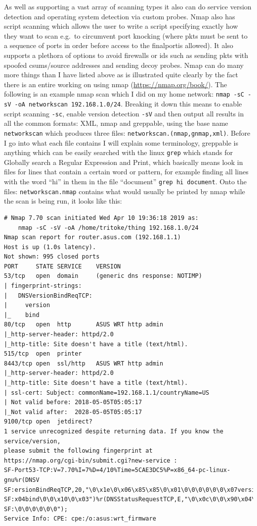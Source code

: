 \documentclass[titlepage]{article}
\begin{document}
As well as supporting a vast array of scanning types it also can do \gls{service} version detection 
and operating system detection via custom probes. Nmap also has script scanning which allows the 
user to write a script specifying exactly how they want to scan e.g.\ to circumvent \gls{port 
knocking} (where \glspl{pkt} must be sent to a sequence of \glspl{port} in order before access to 
the final\gls{port}is allowed). It also supports a plethora of options to avoid firewalls or 
\gls{ids} such as sending \glspl{pkt} with spoofed \glspl{csum}/source addresses and sending decoy 
probes. Nmap can do many more things than I have listed above as is illustrated quite clearly by the
fact there is an entire working on using nmap 
(\href{https://nmap.org/book/}{https://nmap.org/book/}). The following is an example nmap scan
which I did on my home network: \verb|nmap -sC -sV -oA networkscan 192.168.1.0/24|. Breaking
it down this means to enable script scanning \verb|-sc|, enable version detection \verb|-sV|
and then output all results in all the common formats: XML, nmap and greppable, using the
base name \verb|networkscan| which produces three files: \verb|networkscan.(nmap,gnmap,xml)|.
Before I go into what each file contains I will explain some terminology, greppable is anything
which can be easily searched with the linux \verb|grep| which stands for Globally search a Regular
Expression and Print, which basically means look in files for lines that contain a certain word
or pattern, for example finding all lines with the word ``hi'' in them in the file ``document''
\verb|grep hi document|. Onto the files: \verb|networkscan.nmap| contains what would usually
be printed by nmap while the scan is being run, it looks like this:
\begin{verbatim}
# Nmap 7.70 scan initiated Wed Apr 10 19:36:18 2019 as:
    nmap -sC -sV -oA /home/tritoke/thing 192.168.1.0/24
Nmap scan report for router.asus.com (192.168.1.1)
Host is up (1.0s latency).
Not shown: 995 closed ports
PORT     STATE SERVICE    VERSION
53/tcp   open  domain     (generic dns response: NOTIMP)
| fingerprint-strings: 
|   DNSVersionBindReqTCP: 
|     version
|_    bind
80/tcp   open  http       ASUS WRT http admin
|_http-server-header: httpd/2.0
|_http-title: Site doesn't have a title (text/html).
515/tcp  open  printer
8443/tcp open  ssl/http   ASUS WRT http admin
|_http-server-header: httpd/2.0
|_http-title: Site doesn't have a title (text/html).
| ssl-cert: Subject: commonName=192.168.1.1/countryName=US
| Not valid before: 2018-05-05T05:05:17
|_Not valid after:  2028-05-05T05:05:17
9100/tcp open  jetdirect?
1 service unrecognized despite returning data. If you know the service/version,
please submit the following fingerprint at
https://nmap.org/cgi-bin/submit.cgi?new-service :
SF-Port53-TCP:V=7.70%I=7%D=4/10%Time=5CAE3DC5%P=x86_64-pc-linux-gnu%r(DNSV
SF:ersionBindReqTCP,20,"\0\x1e\0\x06\x85\x85\0\x01\0\0\0\0\0\0\x07version\
SF:x04bind\0\0\x10\0\x03")%r(DNSStatusRequestTCP,E,"\0\x0c\0\0\x90\x04\0\0
SF:\0\0\0\0\0\0");
Service Info: CPE: cpe:/o:asus:wrt_firmware
\end{verbatim}
\end{document}
